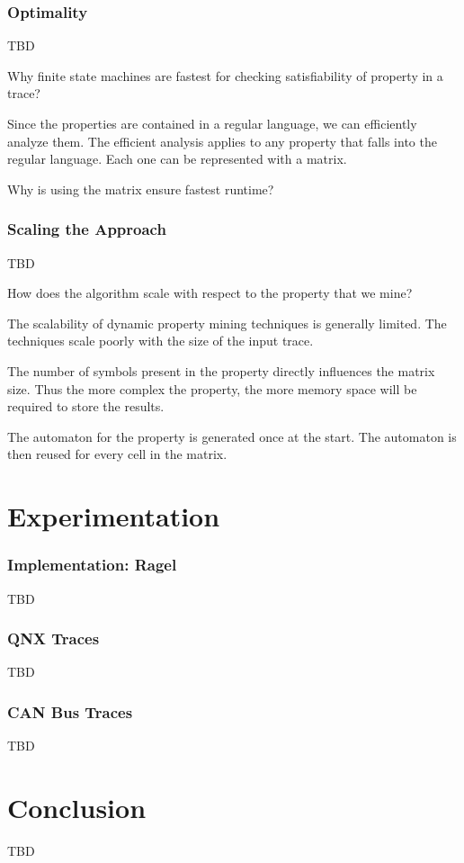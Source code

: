 \documentclass[]{sigplanconf}
\begin{document}
\subsubsection{Optimality}

TBD

Why finite state machines are fastest for checking satisfiability of property in a trace?

Since the properties are contained in a regular language, we can efficiently analyze them. The efficient analysis applies to any property that falls into the regular language. Each one can be represented with a matrix.

Why is using the matrix ensure fastest runtime?

\subsubsection{Scaling the Approach}

TBD

How does the algorithm scale with respect to the property that we mine?

The scalability of dynamic property mining techniques is generally limited.
The techniques scale poorly with the size of the input trace.


The number of symbols present in the property directly influences the matrix size. Thus the more complex the property, the more memory space will be required to store the results.

The automaton for the property is generated once at the start. The automaton is then reused for every cell in the matrix.

\section{Experimentation}

\subsubsection{Implementation: Ragel}

TBD

\subsubsection{QNX Traces}

TBD

\subsubsection{CAN Bus Traces}

TBD

\section{Conclusion}

TBD


%


\end{document}
